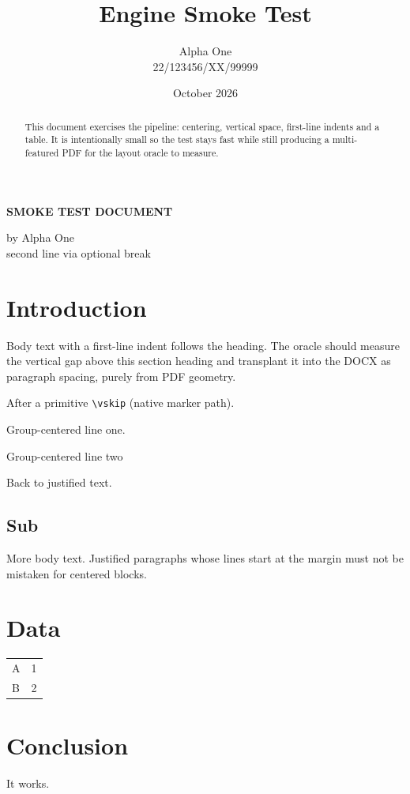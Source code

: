 \documentclass[12pt]{article}
\title{Engine Smoke Test}
\author{Alpha One \\ 22/123456/XX/99999}
\date{October 2026}
\begin{document}
\maketitle

\begin{center}
{\large\bfseries SMOKE TEST DOCUMENT}

\vspace{0.5cm}

by Alpha One \\[0.5cm] second line via optional break
\end{center}

\begin{abstract}
This document exercises the pipeline: centering, vertical space, first-line
indents and a table. It is intentionally small so the test stays fast while
still producing a multi-featured PDF for the layout oracle to measure.
\end{abstract}

\section{Introduction}
Body text with a first-line indent follows the heading. The oracle should
measure the vertical gap above this section heading and transplant it into
the DOCX as paragraph spacing, purely from PDF geometry.

\vskip 6pt

After a primitive \verb|\vskip| (native marker path).

{\centering Group-centered line one.

Group-centered line two
\par}

Back to justified text.

\subsection{Sub}
More body text. Justified paragraphs whose lines start at the margin must not
be mistaken for centered blocks.

\section{Data}
\begin{center}
\begin{tabular}{l c}
\hline
A & 1 \\
B & 2 \\
\hline
\end{tabular}
\end{center}

\section{Conclusion}
It works.
\end{document}
